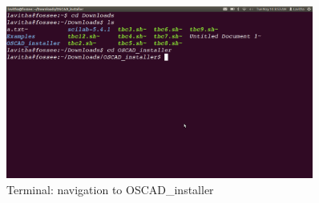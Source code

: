 \begin{figure}[h!]
\centering
\includegraphics[width=0.9\textwidth]{figures/installer1.png}
\caption{Terminal: navigation to OSCAD\_installer}
\label{termn}
\end{figure}

